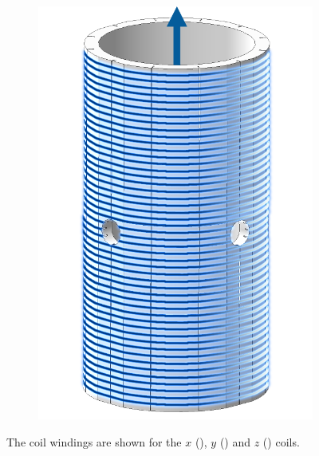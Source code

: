\documentclass[PaulGanssle-Thesis.tex]{subfiles}
\begin{document}
\begin{figure}[ht!]
\begin{subfigure}[b]{0.3\textwidth}
\includegraphics[width=\textwidth]{figures/magnetometer/FieldCoilZ.png}
\caption{}
\label{fig:FieldCoilZ}
\end{subfigure}
\caption{The coil windings are shown for the $x$ (), $y$ () and $z$ () coils.}
\label{fig:fieldcoils}
\end{figure}
\end{document}
